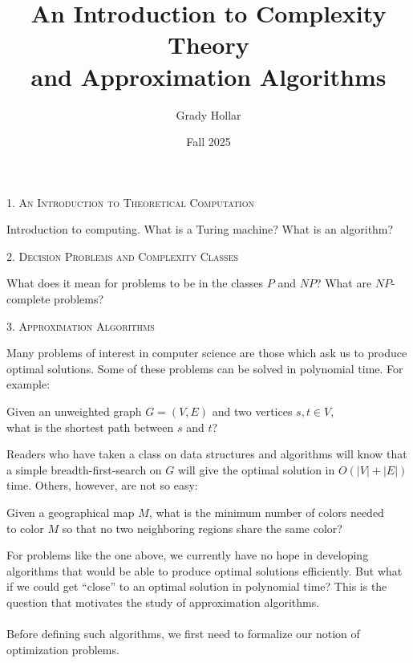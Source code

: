 \documentclass{article}
\title{An Introduction to Complexity Theory\\ and Approximation Algorithms}
\author{Grady Hollar}
\date{Fall 2025}
\begin{document}
\setlength{\abovedisplayskip}{4pt}
\setlength{\belowdisplayskip}{4pt}
\maketitle



\begin{center}
    \textsc{1. An Introduction to Theoretical Computation}
\end{center}

Introduction to computing. What is a Turing machine? What is an algorithm?

\begin{center}
    \textsc{2. Decision Problems and Complexity Classes}
\end{center}

What does it mean for problems to be in the classes $P$ and $NP$? What are $NP$-complete problems?


\begin{center}
    \textsc{3. Approximation Algorithms}
\end{center}



\noindent Many problems of interest in computer science are those which ask us to produce optimal solutions. Some of these problems can be solved in polynomial time. For example:
\begin{center}
    Given an unweighted graph $G = (V,E)$ and two vertices $s,t \in V$,\\
    what is the shortest path between $s$ and $t$?
\end{center}
Readers who have taken a class on data structures and algorithms will know that a simple breadth-first-search on $G$ will give the optimal solution in $O(|V| + |E|)$ time. Others, however, are not so easy:
\begin{center}
    Given a geographical map $M$, what is the minimum number of colors needed\\ to color $M$ so that no two neighboring regions share the same color? 
\end{center}
For problems like the one above, we currently have no hope in developing algorithms that would be able to produce optimal solutions efficiently. But what if we could get ``close'' to an optimal solution in polynomial time? This is the question that motivates the study of approximation algorithms.\\
\\
Before defining such algorithms, we first need to formalize our notion of optimization problems.
\end{document}
